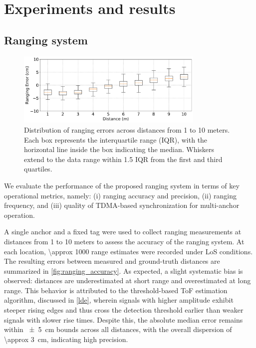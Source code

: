 \chapter{Experiments and results}

\section{Ranging system}

\begin{figure}[tbh]
    \centering
    \includegraphics[width=0.8\textwidth]{Figures/experiments_and_results/ranging_accuracy_box.pdf}
    \caption[Distribution of ranging errors.]{Distribution of ranging errors across distances from 1 to 10 meters. Each box represents the interquartile range (IQR), with the horizontal line inside the box indicating the median. Whiskers extend to the data range within 1.5 IQR from the first and third quartiles.}
    \label{fig:ranging_accuracy}
\end{figure}

We evaluate the performance of the proposed ranging system in terms of key operational metrics, namely: (i) ranging accuracy and precision, (ii) ranging frequency, and (iii) quality of TDMA-based synchronization for multi-anchor operation. 

A single anchor and a fixed tag were used to collect ranging measurements at distances from 1 to 10 meters to assess the accuracy of the ranging system. At each location, \SI{\approx 1000}{} range estimates were recorded under LoS conditions. The resulting errors between measured and ground-truth distances are summarized in \autoref{fig:ranging_accuracy}. As expected, a slight systematic bias is observed: distances are underestimated at short range and overestimated at long range. This behavior is attributed to the threshold-based ToF estimation algorithm, discussed in \autoref{lde}, wherein signals with higher amplitude exhibit steeper rising edges and thus cross the detection threshold earlier than weaker signals with slower rise times.  Despite this, the absolute median error remains within \SI{\pm 5}{\centi\metre} bounds across all distances, with the overall dispersion of \SI{\approx 3}{\centi\metre}, indicating high precision.

